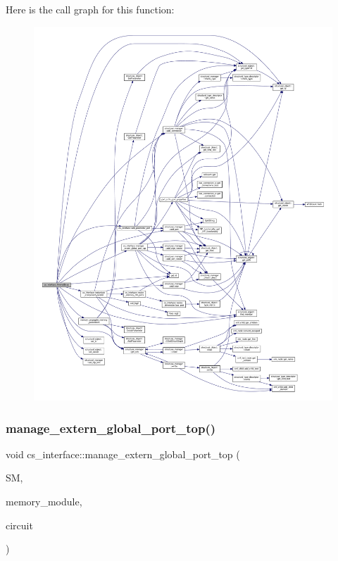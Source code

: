 Here is the call graph for this function\+:
\nopagebreak
\begin{figure}[H]
\begin{center}
\leavevmode
\includegraphics[width=350pt]{d1/dfa/classcs__interface_aee8a7879cdc7e9591c5c7bce22c3d1a7_cgraph}
\end{center}
\end{figure}
\mbox{\label{classcs__interface_a1079f7e26ff08aef06667ecd87181c7d}} 
\subsubsection{\texorpdfstring{manage\+\_\+extern\+\_\+global\+\_\+port\+\_\+top()}{manage\_extern\_global\_port\_top()}}
{\footnotesize\ttfamily void cs\+\_\+interface\+::manage\+\_\+extern\+\_\+global\+\_\+port\+\_\+top (\begin{DoxyParamCaption}\item[{const \hyperlink{structural__manager_8hpp_ab3136f0e785d8535f8d252a7b53db5b5}{structural\+\_\+manager\+Ref}}]{SM,  }\item[{const \hyperlink{structural__objects_8hpp_a8ea5f8cc50ab8f4c31e2751074ff60b2}{structural\+\_\+object\+Ref}}]{memory\+\_\+module,  }\item[{const \hyperlink{structural__objects_8hpp_a8ea5f8cc50ab8f4c31e2751074ff60b2}{structural\+\_\+object\+Ref}}]{circuit }\end{DoxyParamCaption})\hspace{0.3cm}{\ttfamily [protected]}}



